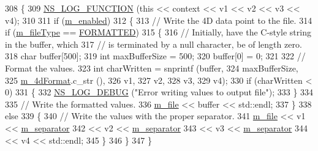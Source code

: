 \begin{DoxyCode}
308 \{
309   \hyperlink{log-macros-disabled_8h_a90b90d5bad1f39cb1b64923ea94c0761}{NS\_LOG\_FUNCTION} (\textcolor{keyword}{this} << context << v1 << v2 << v3 << v4);
310 
311   \textcolor{keywordflow}{if} (\hyperlink{classns3_1_1DataCollectionObject_a3e8b0578f03044b1db4811ecff2be7ea}{m\_enabled})
312     \{
313       \textcolor{comment}{// Write the 4D data point to the file.}
314       \textcolor{keywordflow}{if} (\hyperlink{classns3_1_1FileAggregator_aa2a8abfe3082a802dc6705e701f73e9e}{m\_fileType} == \hyperlink{classns3_1_1FileAggregator_aedb3108205a498f7ac0c564508067e2da7e34fea5d3f680d09518ee58ce4711f0}{FORMATTED})
315         \{
316           \textcolor{comment}{// Initially, have the C-style string in the buffer, which}
317           \textcolor{comment}{// is terminated by a null character, be of length zero.}
318           \textcolor{keywordtype}{char} buffer[500];
319           \textcolor{keywordtype}{int} maxBufferSize = 500;
320           buffer[0] = 0;
321 
322           \textcolor{comment}{// Format the values.}
323           \textcolor{keywordtype}{int} charWritten = snprintf (buffer,
324                                       maxBufferSize,
325                                       \hyperlink{classns3_1_1FileAggregator_a388f2825222368149d5b0abf1bc6b781}{m\_4dFormat}.c\_str (),
326                                       v1,
327                                       v2,
328                                       v3,
329                                       v4);
330           \textcolor{keywordflow}{if} (charWritten < 0)
331             \{
332               \hyperlink{group__logging_ga413f1886406d49f59a6a0a89b77b4d0a}{NS\_LOG\_DEBUG} (\textcolor{stringliteral}{"Error writing values to output file"});
333             \}
334 
335           \textcolor{comment}{// Write the formatted values.}
336           \hyperlink{classns3_1_1FileAggregator_a756affa0d614724be513ceedcff62ac0}{m\_file} << buffer << std::endl;
337         \}
338       \textcolor{keywordflow}{else}
339         \{
340           \textcolor{comment}{// Write the values with the proper separator.}
341           \hyperlink{classns3_1_1FileAggregator_a756affa0d614724be513ceedcff62ac0}{m\_file} << v1 << \hyperlink{classns3_1_1FileAggregator_a1f74a4c07f663d535da56dfb70414a15}{m\_separator}
342                  << v2 << \hyperlink{classns3_1_1FileAggregator_a1f74a4c07f663d535da56dfb70414a15}{m\_separator}
343                  << v3 << \hyperlink{classns3_1_1FileAggregator_a1f74a4c07f663d535da56dfb70414a15}{m\_separator}
344                  << v4 << std::endl;
345         \}
346     \}
347 \}
\end{DoxyCode}
